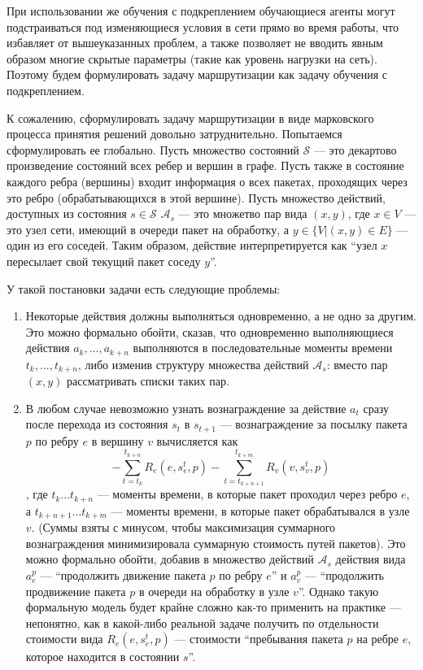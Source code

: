 \documentclass[specification, annotation]{itmo-student-thesis}
\begin{document}
При использовании же обучения с подкреплением обучающиеся агенты могут
подстраиваться под изменяющиеся условия в сети прямо во время работы, что
избавляет от вышеуказанных проблем, а также позволяет не вводить явным образом
многие скрытые параметры (такие как уровень нагрузки на сеть). Поэтому будем
формулировать задачу маршрутизации как задачу обучения с подкреплением.

К сожалению, сформулировать задачу маршрутизации в виде марковского процесса
принятия решений довольно затруднительно. Попытаемся сформулировать ее
глобально. Пусть множество состояний $\mathcal{S}$ --- это декартово произведение
состояний всех ребер и вершин в графе. Пусть также в состояние каждого ребра
(вершины) входит информация о всех пакетах, проходящих через это ребро
(обрабатывающихся в этой вершине). Пусть множество действий, доступных из
состояния $s \in \mathcal{S}$ $\mathcal{A}_s$ --- это множетво пар вида $(x,y)$,
где $x \in V$ --- это узел сети, имеющий в очереди пакет на обработку, а
$y \in \{V | (x, y) \in E\}$ --- один из его соседей. Таким образом, действие
интерпретируется как \enquote{узел $x$ пересылает свой текущий пакет соседу $y$}.

У такой постановки задачи есть следующие проблемы:
\begin{enumerate}
\item Некоторые действия должны выполняться одновременно, а не одно за другим.
  Это можно формально обойти, сказав, что одновременно выполняющиеся действия
  $a_k, ... , a_{k+n}$ выполняются в последовательные моменты времени
  $t_k, ... , t_{k+n}$, либо изменив структуру множества действий
  $\mathcal{A}_s$: вместо пар $(x, y)$ рассматривать списки таких пар.
\item В любом случае невозможно узнать вознаграждение за действие $a_t$ сразу
  после перехода из состояния $s_t$ в $s_{t+1}$ --- вознаграждение за посылку
  пакета $p$ по ребру $e$ в вершину $v$ вычисляется как
  \[
  - \sum\limits_{t=t_k}^{t_{k+n}} {R_e(e, s_e^t, p)} -
  \sum\limits_{t=t_{k+n+1}}^{t_{k+m}} R_v(v, s_v^t, p)
  \]
  , где $t_k ... t_{k+n}$ --- моменты времени, в которые пакет проходил через
  ребро $e$, а $t_{k+n+1} ... t_{k+m}$ --- моменты времени, в которые пакет
  обрабатывался в узле $v$. (Суммы взяты с минусом, чтобы максимизация
  суммарного вознаграждения минимизировала суммарную стоимость путей пакетов).
  Это можно формально обойти, добавив в множество действий $\mathcal{A}_s$
  действия вида $a_e^p$ --- \enquote{продолжить движение пакета
  $p$ по ребру $e$} и $a_v^p$ --- \enquote{продолжить продвижение пакета $p$ в очереди на
  обработку в узле $v$}. Однако такую формальную модель будет крайне сложно
  как-то применить на практике --- непонятно, как в какой-либо реальной задаче
  получить по отдельности стоимости вида $R_e(e, s_e^t, p)$ --- стоимости
  \enquote{пребывания пакета $p$ на ребре $e$, которое находится в состоянии $s$}.
\end{enumerate}
\end{document}
